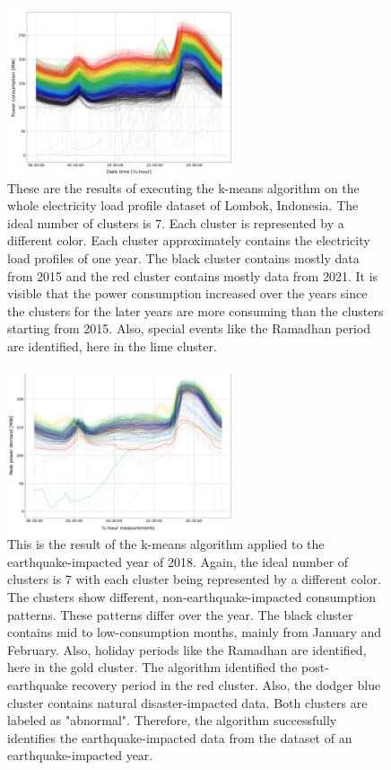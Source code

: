 \begin{figure}[H]
    \centering
    \includegraphics[width=0.6\textwidth]{figures/jessen_ndImpactedClusters/jessen_wholeDataClustering.png}
    \caption{These are the results of executing the k-means algorithm on the whole electricity load profile dataset of Lombok, Indonesia.
    The ideal number of clusters is $7$.
    Each cluster is represented by a different color.
    Each cluster approximately contains the electricity load profiles of one year.
    The black cluster contains mostly data from 2015 and the red cluster contains mostly data from 2021.
    It is visible that the power consumption increased over the years since the clusters for the later years are more consuming than the clusters starting from 2015.
    Also, special events like the Ramadhan period are identified, here in the lime cluster.
    }
    \label{fig:whole_data_clustering_results}
\end{figure}

\begin{figure}[H]
    \centering
    \includegraphics[width=0.6\textwidth]{figures/jessen_ndImpactedClusters/jessen_Clustering2018.png}
    \caption{This is the result of the k-means algorithm applied to the earthquake-impacted year of 2018.
    Again, the ideal number of clusters is $7$ with each cluster being represented by a different color.
    The clusters show different, non-earthquake-impacted consumption patterns.
    These patterns differ over the year.
    The black cluster contains mid to low-consumption months, mainly from January and February.
    Also, holiday periods like the Ramadhan are identified, here in the gold cluster.
    The algorithm identified the post-earthquake recovery period in the red cluster.
    Also, the dodger blue cluster contains natural disaster-impacted data.
    Both clusters are labeled as "abnormal".
    Therefore, the algorithm successfully identifies the earthquake-impacted data from the dataset of an earthquake-impacted year.
    }
    \label{fig:clustering_results_2018}
\end{figure}

